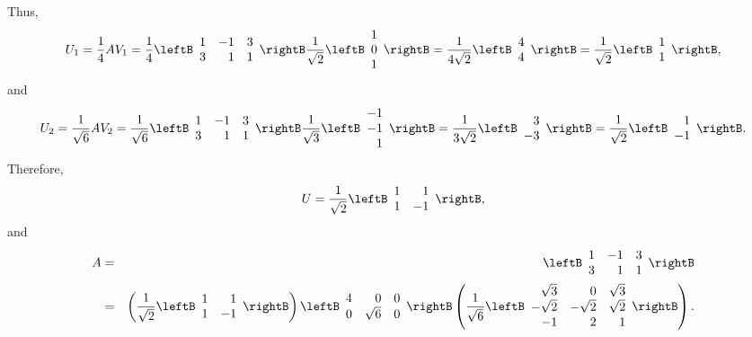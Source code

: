 \begin{solution}
Thus,
\[ U_1 = \frac{1}{4}AV_1 
= \frac{1}{4}
\leftB\begin{array}{rrr} 1 & -1 & 3 \\ 3 & 1 & 1 \end{array}\rightB
\frac{1}{\sqrt{2}}\leftB\begin{array}{r} 1\\ 0\\ 1 \end{array}\rightB
= \frac{1}{4\sqrt 2}\leftB\begin{array}{r} 4\\ 4 \end{array}\rightB
= \frac{1}{\sqrt 2}\leftB\begin{array}{r} 1\\ 1 \end{array}\rightB,\]
and
\[ U_2 = \frac{1}{\sqrt 6}AV_2 
= \frac{1}{\sqrt 6}
\leftB\begin{array}{rrr} 1 & -1 & 3 \\ 3 & 1 & 1 \end{array}\rightB
\frac{1}{\sqrt{3}}\leftB\begin{array}{r} -1\\ -1\\ 1 \end{array}\rightB
=\frac{1}{3\sqrt 2}\leftB\begin{array}{r} 3\\ -3 \end{array}\rightB
=\frac{1}{\sqrt 2}\leftB\begin{array}{r} 1\\ -1 \end{array}\rightB.
\]
Therefore,
\[ U=\frac{1}{\sqrt{2}}\leftB\begin{array}{rr} 1 & 1 \\
1 & -1 \end{array}\rightB,\]
and
\begin{eqnarray*}
A & = & \leftB\begin{array}{rrr} 1 & -1 & 3 \\ 3 & 1 & 1 \end{array}\rightB\\
& = & \left(\frac{1}{\sqrt{2}}\leftB\begin{array}{rr} 1 & 1 \\
1 & -1 \end{array}\rightB\right)
\leftB\begin{array}{rrr} 4 & 0 & 0 \\
0 & \sqrt 6 & 0 \end{array}\rightB
\left(\frac{1}{\sqrt{6}}\leftB\begin{array}{rrr}
\sqrt 3 & 0 & \sqrt 3  \\
-\sqrt 2 & -\sqrt 2 & \sqrt2 \\
-1 & 2 & 1 \end{array}\rightB\right).
\end{eqnarray*}
\end{solution}

